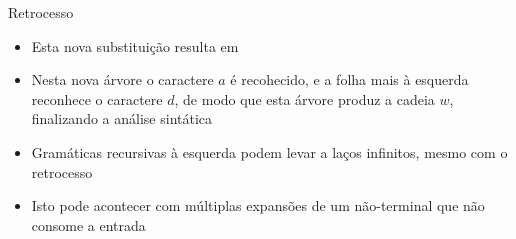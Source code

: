 \begin{frame}[fragile]{Retrocesso}

    \begin{itemize}
        \item Esta nova substituição resulta em
        \begin{center}
        \end{center}
        \pause

        \item Nesta nova árvore o caractere $a$ é recohecido, e a folha mais à esquerda reconhece o caractere $d$, de modo que esta árvore produz a cadeia $w$,
            finalizando a análise sintática
        \pause

        \item Gramáticas recursivas à esquerda podem levar a laços infinitos, mesmo com o retrocesso
        \pause

        \item Isto pode acontecer com múltiplas expansões de um não-terminal que não consome a entrada
    \end{itemize}
\end{frame}

